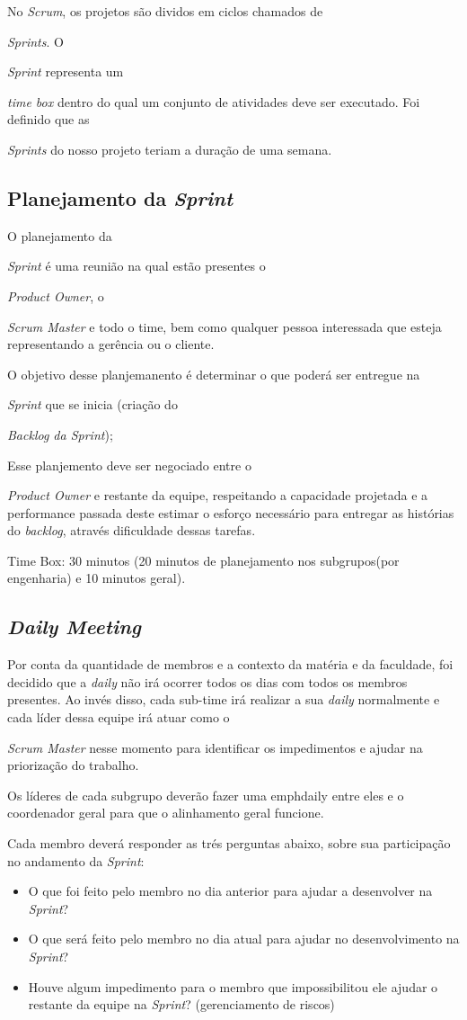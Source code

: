 No \emph{Scrum}, os projetos são dividos em ciclos chamados de {\emph{Sprints}. O {\emph{Sprint} representa um {\emph{time box} dentro do qual um conjunto 
de atividades deve ser executado. Foi definido que as {\emph{Sprints} do nosso projeto teriam a duração de uma semana. 

\subsection{Planejamento da \emph{Sprint}}

O planejamento da {\emph{Sprint} é uma reunião na qual estão presentes o {\emph{Product Owner}, o {\emph{Scrum Master} e todo o time, 
bem como qualquer pessoa interessada que esteja representando a gerência ou o cliente.

O objetivo desse planjemanento é determinar o que poderá ser entregue na {\emph{Sprint} que se inicia (criação do {\emph{Backlog da Sprint});

Esse planjemento deve ser negociado entre o {\emph{Product Owner} e restante da equipe, respeitando a capacidade projetada e a performance passada deste
estimar o esforço necessário para entregar as histórias do \emph{backlog}, através dificuldade dessas tarefas. 

Time Box: 30 minutos (20 minutos de planejamento nos subgrupos(por engenharia) e 10 minutos geral).

\subsection{\emph{Daily Meeting}}

Por conta da quantidade de membros e a contexto da matéria e da faculdade, foi decidido que a \emph{daily} não irá ocorrer todos os dias com todos os membros presentes. 
Ao invés disso, cada sub-time irá realizar a sua \emph{daily} normalmente e cada líder dessa equipe irá atuar como o {\emph{Scrum Master}
nesse momento para identificar os impedimentos e ajudar na priorização do trabalho.

Os líderes de cada subgrupo deverão fazer uma emph{daily} entre eles e o coordenador geral para que o alinhamento geral funcione. 

Cada membro deverá responder as trés perguntas abaixo, sobre sua participação no andamento da \emph{Sprint}:

\begin{itemize}
    \item O que foi feito pelo membro no dia anterior para ajudar a desenvolver na \emph{Sprint}?
    \item O que será feito pelo membro no dia atual para ajudar no desenvolvimento na \emph{Sprint}?
    \item Houve algum impedimento para o membro que impossibilitou ele ajudar o restante da equipe na \emph{Sprint}? (gerenciamento de riscos)
\end{itemize}

}}}}}}}}}}}
